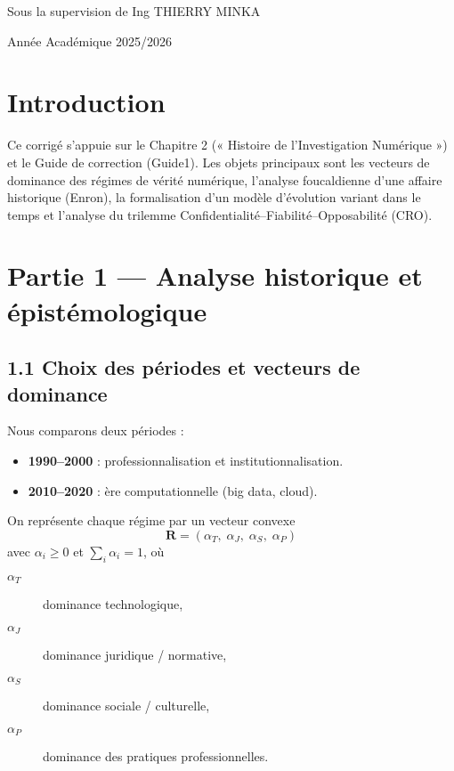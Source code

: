 \documentclass[12pt,a4paper]{article}
\begin{document}
\begin{titlepage}
    \vspace{1cm}
	\begin{Large}
	Sous la supervision de Ing THIERRY MINKA
	\end{Large}
    
    \vspace{1cm}
	\begin{large}
	Année Académique 2025/2026
	\end{large}
\end{titlepage}

\tableofcontents
\clearpage

\section{Introduction}
Ce corrigé s'appuie sur le Chapitre 2 (« Histoire de l'Investigation Numérique ») et le Guide de correction (Guide1). Les objets principaux sont les vecteurs de dominance des régimes de vérité numérique, l'analyse foucaldienne d'une affaire historique (Enron), la formalisation d'un modèle d'évolution variant dans le temps et l'analyse du trilemme Confidentialité--Fiabilité--Opposabilité (CRO).

\section{Partie 1 — Analyse historique et épistémologique}

\subsection{1.1 Choix des périodes et vecteurs de dominance}
Nous comparons deux périodes :
\begin{itemize}
  \item \textbf{1990--2000} : professionnalisation et institutionnalisation.
  \item \textbf{2010--2020} : ère computationnelle (big data, cloud).
\end{itemize}

On représente chaque régime par un vecteur convexe
\[
\mathbf{R} = ( \alpha_T,\; \alpha_J,\; \alpha_S,\; \alpha_P )
\]
avec $\alpha_i \ge 0$ et $\sum_i \alpha_i = 1$, où
\begin{description}
  \item[$\alpha_T$] dominance technologique,
  \item[$\alpha_J$] dominance juridique / normative,
  \item[$\alpha_S$] dominance sociale / culturelle,
  \item[$\alpha_P$] dominance des pratiques professionnelles.
\end{description}
\end{document}
